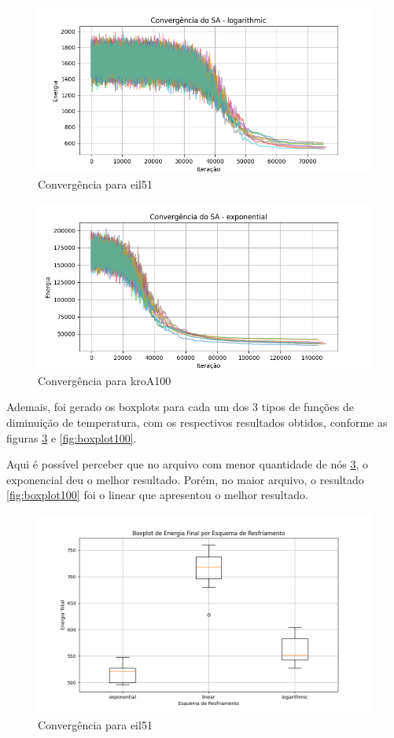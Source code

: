 \documentclass[12pt]{article}
\begin{document}
\begin{figure}[H]
  \centering
  \includegraphics[width=.9\textwidth]{imgs/convergence_51.png}
  \caption{Convergência para eil51}
  \label{fig:convergencia51}
  \end{figure}

\begin{figure}[H]
  \centering
  \includegraphics[width=.9\textwidth]{imgs/convergence_100.png}
  \caption{Convergência para kroA100}
  \label{fig:convergencia100}
   \end{figure}

Ademais, foi gerado os boxplots para cada um dos 3 tipos de funções de diminuição de temperatura, com os respectivos resultados obtidos, conforme as figuras \ref{fig:boxplot51} e \ref{fig:boxplot100}.

Aqui é possível perceber que no arquivo com menor quantidade de nós \ref{fig:boxplot51}, o exponencial deu o melhor resultado. 
Porém, no maior arquivo, o resultado \ref{fig:boxplot100} foi o linear que apresentou o melhor resultado.

\begin{figure}[H]
  \centering
  \includegraphics[width=.9\textwidth]{imgs/boxplot_51.png}
  \caption{Convergência para eil51}
  \label{fig:boxplot51}
\end{figure}
\end{document}
